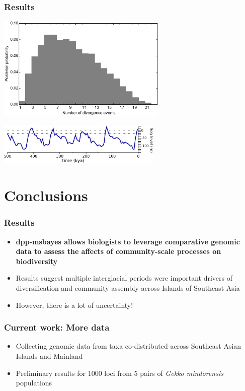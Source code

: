{\begin{frame}
    \frametitle{Results}
    \centerline{
    \includegraphics[height=5cm]{../../empirical-analyses/plots/philippines-dpp-psi-posterior.pdf}}
    \smallskip
    \centerline{
    \includegraphics[height=2cm]{../images/sea-level-only.pdf}}
\end{frame}

\section{Conclusions}

\begin{frame}
    \frametitle{Results}
    \begin{itemize}
        \item \textbf{dpp-msbayes allows biologists to leverage comparative
                genomic data to assess the affects of community-scale processes
                on biodiversity}
        \item<2-> Results suggest multiple interglacial periods were important
            drivers of diversification and community assembly across Islands of
            Southeast Asia
        \item<3-> However, there is a lot of uncertainty!
    \end{itemize}
\end{frame}


\begin{frame}[t]
    \frametitle{Current work: More data}
    \begin{minipage}[t][0.15\textheight][c]{\linewidth}
    \begin{itemize}
        \item<1-> Collecting genomic data from taxa co-distributed across
            Southeast Asian Islands and Mainland
        \item<2-> Preliminary results for 1000 loci from 5 pairs of \emph{Gekko
                mindorensis} populations
    \end{itemize}
    \end{minipage}


\end{frame}}
